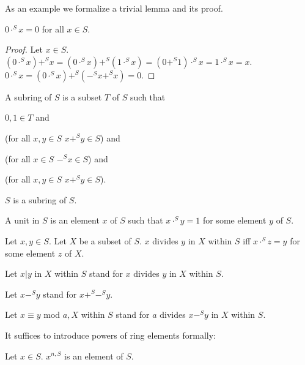 \documentclass{article}
\begin{document}
As an example we formalize a trivial lemma and its proof.

\begin{forthel}
  \begin{lemma}
    $ 0 \cdot^{S} x = 0$ for all $x \in S$.
  \end{lemma}
  \begin{proof}
    Let $x \in S$.
    $(0 \cdot^{S} x) +^{S} x = (0 \cdot^{S} x) +^{S} (1 \cdot^{S} x) = (0 +^{S} 1) \cdot^{S} x =  1 \cdot^{S} x = x $.
    $ 0 \cdot^{S} x = (0 \cdot^{S} x) +^{S} (-^{S}x +^{S} x) = 0$.
  \end{proof}

  \begin{definition}
    A subring of $S$ is a subset $T$ of $S$ such that

    $0, 1 \in T$ and

    (for all $x,y \in S$ $x +^{S} y \in S$) and

    (for all $x \in S$ $-^{S} x \in S$) and

    (for all $x,y \in S$ $x +^{S} y \in S$).
  \end{definition}

  \begin{lemma}
    $S$ is a subring of $S$.
  \end{lemma}

  \begin{definition}
    A unit in $S$ is an element $x$ of $S$ such that $x \cdot^{S} y = 1$ for some element $y$ of $S$.
  \end{definition}

  \begin{definition}
    Let $x,y \in S$.
    Let $X$ be a subset of $S$.
    $x$ divides $y$ in $X$ within $S$ iff $x \cdot^{S} z = y$ for some element $z$ of $X$.
  \end{definition}

  Let $x | y$ in $X$ within $S$ stand for $x$ divides $y$ in $X$ within $S$.

  Let $x -^{S} y$ stand for $x +^{S} -^{S} y$.

  Let $x \equiv y$ mod $a,X$ within $S$ stand for $a$ divides $x-^{S} y$ in $X$ within $S$.
\end{forthel}

It suffices to introduce powers of ring elements formally:

\begin{forthel}
  \begin{signature}
    Let $x \in S$.
    $x^{n,S}$ is an element of $S$.
  \end{signature}
\end{forthel}
\end{document}
